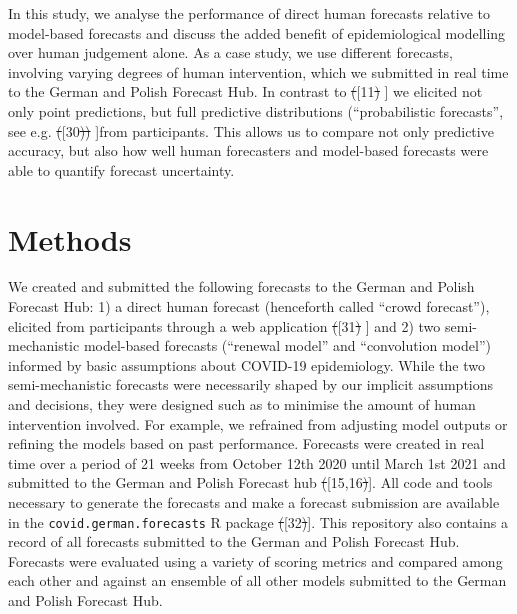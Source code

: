 \documentclass[10pt,letterpaper]{article} %
\providecommand{\DIFaddtex}[1]{{\protect\color{blue}\uwave{#1}}} %
\providecommand{\DIFdeltex}[1]{{\protect\color{red}\sout{#1}}}                      %
\providecommand{\DIFaddbegin}{} %
\providecommand{\DIFaddend}{} %
\providecommand{\DIFdelbegin}{} %
\providecommand{\DIFdelend}{} %
\providecommand{\DIFadd}[1]{\texorpdfstring{\DIFaddtex{#1}}{#1}} %
\providecommand{\DIFdel}[1]{\texorpdfstring{\DIFdeltex{#1}}{}} %
\newcommand{\DIFscaledelfig}{0.5}
\newlength{\DIFdelgraphicswidth} %
\newlength{\DIFdelgraphicsheight} %
\newcommand{\DIFaddincludegraphics}[2][]{{\color{blue}\fbox{\DIFOincludegraphics[#1]{#2}}}} %
\newcommand{\DIFdelincludegraphics}[2][]{%
\sbox{\DIFdelgraphicsbox}{\DIFOincludegraphics[#1]{#2}}%
\settoboxwidth{\DIFdelgraphicswidth}{\DIFdelgraphicsbox} %
\settoboxtotalheight{\DIFdelgraphicsheight}{\DIFdelgraphicsbox} %
\scalebox{\DIFscaledelfig}{%
\parbox[b]{\DIFdelgraphicswidth}{\usebox{\DIFdelgraphicsbox}\\[-\baselineskip] \rule{\DIFdelgraphicswidth}{0em}}\llap{\resizebox{\DIFdelgraphicswidth}{\DIFdelgraphicsheight}{%
\setlength{\unitlength}{\DIFdelgraphicswidth}%
\begin{picture}(1,1)%
\thicklines\linethickness{2pt} %
{\color[rgb]{1,0,0}\put(0,0){\framebox(1,1){}}}%
{\color[rgb]{1,0,0}\put(0,0){\line( 1,1){1}}}%
{\color[rgb]{1,0,0}\put(0,1){\line(1,-1){1}}}%
\end{picture}%
}\hspace*{3pt}}} %
} %
\DeclareRobustCommand{\DIFaddbegin}{\DIFOaddbegin \let\includegraphics\DIFaddincludegraphics} %
\DeclareRobustCommand{\DIFaddend}{\DIFOaddend \let\includegraphics\DIFOincludegraphics} %
\DeclareRobustCommand{\DIFdelbegin}{\DIFOdelbegin \let\includegraphics\DIFdelincludegraphics} %
\DeclareRobustCommand{\DIFdelend}{\DIFOaddend \let\includegraphics\DIFOincludegraphics} %
\begin{document}
In this study, we analyse the performance of direct human forecasts
relative to model-based forecasts and discuss the added benefit of
epidemiological modelling over human judgement alone. As a case study,
we use different forecasts, involving varying degrees of human
intervention, which we submitted in real time to the German and Polish
Forecast Hub. In contrast to \DIFdelbegin \DIFdel{(}\DIFdelend \DIFaddbegin {[}\DIFaddend 11\DIFdelbegin \DIFdel{) }\DIFdelend \DIFaddbegin {]} \DIFaddend we elicited not only point
predictions, but full predictive distributions (``probabilistic
forecasts'', see e.g. \DIFdelbegin \DIFdel{(}\DIFdelend \DIFaddbegin {[}\DIFaddend 30\DIFdelbegin \DIFdel{)) }\DIFdelend \DIFaddbegin {]}\DIFadd{) }\DIFaddend from participants. This allows us to
compare not only predictive accuracy, but also how well human
forecasters and model-based forecasts were able to quantify forecast
uncertainty.

\hypertarget{methods}{%
\section{Methods}\label{methods}}

We created and submitted the following forecasts to the German and
Polish Forecast Hub: 1) a direct human forecast (henceforth called
``crowd forecast''), elicited from participants through a web
application \DIFdelbegin \DIFdel{(}\DIFdelend \DIFaddbegin {[}\DIFaddend 31\DIFdelbegin \DIFdel{) }\DIFdelend \DIFaddbegin {]} \DIFaddend and 2) two semi-mechanistic model-based forecasts
(``renewal model'' and ``convolution model'') informed by basic
assumptions about COVID-19 epidemiology. While the two semi-mechanistic
forecasts were necessarily shaped by our implicit assumptions and
decisions, they were designed such as to minimise the amount of human
intervention involved. For example, we refrained from adjusting model
outputs or refining the models based on past performance. Forecasts were
created in real time over a period of 21 weeks from October 12th 2020
until March 1st 2021 and submitted to the German and Polish Forecast hub
\DIFdelbegin \DIFdel{(}\DIFdelend \DIFaddbegin {[}\DIFaddend 15,16\DIFdelbegin \DIFdel{)}\DIFdelend \DIFaddbegin {]}\DIFaddend . All code and tools necessary to generate the forecasts and
make a forecast submission are available in the
\texttt{covid.german.forecasts} R package \DIFdelbegin \DIFdel{(}\DIFdelend \DIFaddbegin {[}\DIFaddend 32\DIFdelbegin \DIFdel{)}\DIFdelend \DIFaddbegin {]}\DIFaddend . This repository also
contains a record of all forecasts submitted to the German and Polish
Forecast Hub. Forecasts were evaluated using a variety of scoring
metrics and compared among each other and against an ensemble of all
other models submitted to the German and Polish Forecast Hub.
\end{document}
